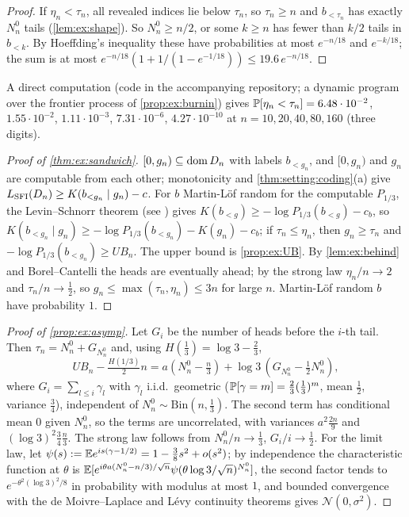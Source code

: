 \begin{proof}
If $\eta_n<\tau_n$, all revealed indices lie below $\tau_n$, so $\tau_n\ge n$ and $b_{<\tau_n}$ has exactly $N^0_n$ tails (\cref{lem:ex:shape}). So $N^0_n\ge n/2$, or some $k\ge n$ has fewer than $k/2$ tails in $b_{<k}$. By Hoeffding's inequality \citep{hoeffding1963probability} these have probabilities at most $e^{-n/18}$ and $e^{-k/18}$; the sum is at most $e^{-n/18}(1+1/(1-e^{-1/18}))\le19.6\,e^{-n/18}$.
\end{proof}
A direct computation (code in the accompanying repository; a dynamic program over the frontier process of \cref{prop:ex:burnin}) gives $\mathbb{P}[\eta_n<\tau_n]=6.48\cdot10^{-2}$, $1.55\cdot10^{-2}$, $1.11\cdot10^{-3}$, $7.31\cdot10^{-6}$, $4.27\cdot10^{-10}$ at $n=10,20,40,80,160$ (three digits).

\begin{proof}[Proof of \cref{thm:ex:sandwich}]
$[0,g_n)\subseteq\operatorname{dom} D_n$ with labels $b_{<g_n}$, and $[0,g_n)$ and $g_n$ are computable from each other; monotonicity and \cref{thm:setting:coding}(a) give $L_{\mathrm{SFI}}(D_n)\ge K(b_{<g_n}\mid g_n)-c$. For $b$ Martin-L\"of random for the computable $P_{1/3}$, the Levin--Schnorr theorem (see \citealp{li2008introduction}) gives $K(b_{<g})\ge-\log P_{1/3}(b_{<g})-c_b$, so $K(b_{<g_n}\mid g_n)\ge-\log P_{1/3}(b_{<g_n})-K(g_n)-c_b$; if $\tau_n\le\eta_n$, then $g_n\ge\tau_n$ and $-\log P_{1/3}(b_{<g_n})\ge UB_n$. The upper bound is \cref{prop:ex:UB}. By \cref{lem:ex:behind} and Borel--Cantelli the heads are eventually ahead; by the strong law $\eta_n/n\to2$ and $\tau_n/n\to\frac12$, so $g_n\le\max(\tau_n,\eta_n)\le3n$ for large $n$. Martin-L\"of random $b$ have probability $1$.
\end{proof}

\begin{proof}[Proof of \cref{prop:ex:asymp}]
Let $G_i$ be the number of heads before the $i$-th tail. Then $\tau_n=N^0_n+G_{N^0_n}$ and, using $H(\frac13)=\log3-\frac23$,
\[UB_n-\tfrac{H(1/3)}2n=a(N^0_n-\tfrac n3)+\log3\,(G_{N^0_n}-\tfrac12N^0_n),\]
where $G_i=\sum_{l\le i}\gamma_l$ with $\gamma_l$ i.i.d.\ geometric ($\mathbb{P}[\gamma=m]=\frac23(\frac13)^m$, mean $\frac12$, variance $\frac34$), independent of $N^0_n\sim\mathrm{Bin}(n,\frac13)$. The second term has conditional mean $0$ given $N^0_n$, so the terms are uncorrelated, with variances $a^2\frac{2n}9$ and $(\log3)^2\frac34\frac n3$. The strong law follows from $N^0_n/n\to\frac13$, $G_i/i\to\frac12$. For the limit law, let $\psi(s):=\mathbb{E} e^{is(\gamma-1/2)}=1-\frac38s^2+o(s^2)$; by independence the characteristic function at $\theta$ is $\mathbb{E}[e^{i\theta a(N^0_n-n/3)/\sqrt n}\psi(\theta\log3/\sqrt n)^{N^0_n}]$, the second factor tends to $e^{-\theta^2(\log3)^2/8}$ in probability with modulus at most $1$, and bounded convergence with the de Moivre--Laplace and L\'evy continuity theorems gives $\mathcal N(0,\sigma^2)$.
\end{proof}

